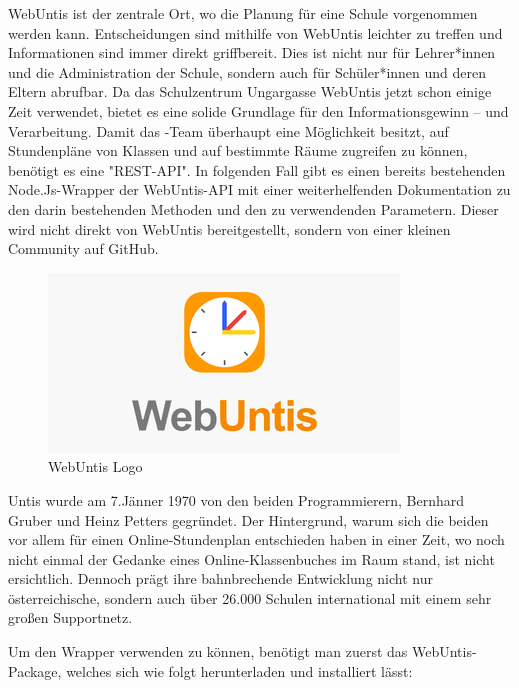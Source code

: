 

WebUntis ist der zentrale Ort, wo die Planung für eine Schule vorgenommen werden kann. Entscheidungen sind mithilfe von WebUntis leichter zu treffen und Informationen sind immer direkt griffbereit. Dies ist nicht nur für Lehrer*innen und die Administration der Schule, sondern auch für Schüler*innen und deren Eltern abrufbar. Da das Schulzentrum Ungargasse WebUntis jetzt schon einige Zeit verwendet, bietet es eine solide Grundlage für den Informationsgewinn – und Verarbeitung. Damit das \ZELIA-Team überhaupt eine Möglichkeit besitzt, auf Stundenpläne von Klassen und auf bestimmte Räume zugreifen zu können, benötigt es eine "REST-API". In folgenden Fall gibt es einen bereits bestehenden Node.Js-Wrapper der WebUntis-API mit einer weiterhelfenden Dokumentation zu den darin bestehenden Methoden und den zu verwendenden Parametern. Dieser wird nicht direkt von WebUntis bereitgestellt, sondern von einer kleinen Community auf GitHub. \cite{WebUntisWrapper}

\begin{figure}[H]
    \centering
    \includegraphics{media/WebUntis/WebUntisLogo.png}
    \caption{WebUntis Logo \cite{WebUntisLogo}}
\end{figure}


Untis wurde am 7.Jänner 1970 von den beiden Programmierern, Bernhard Gruber und Heinz Petters gegründet. Der Hintergrund, warum sich die beiden vor allem für einen Online-Stundenplan entschieden haben in einer Zeit, wo noch nicht einmal der Gedanke eines Online-Klassenbuches im Raum stand, ist nicht ersichtlich. Dennoch prägt ihre bahnbrechende Entwicklung nicht nur österreichische, sondern auch über 26.000 Schulen international mit einem sehr großen Supportnetz. \cite{Untis}


Um den Wrapper verwenden zu können, benötigt man zuerst das WebUntis-Package, welches sich wie folgt herunterladen und installiert lässt:



